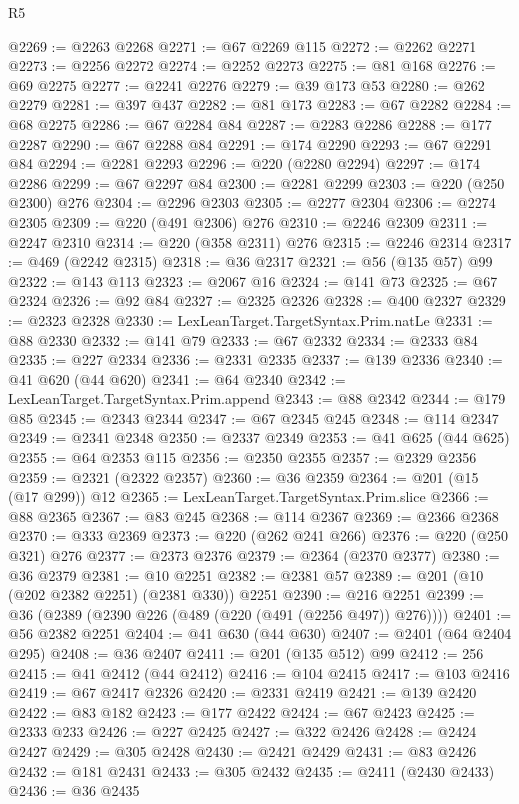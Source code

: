 \begin{lexlean}{R5}
\begin{coremodule}
@2269 := @2263 @2268
@2271 := @67 @2269 @115
@2272 := @2262 @2271
@2273 := @2256 @2272
@2274 := @2252 @2273
@2275 := @81 @168
@2276 := @69 @2275
@2277 := @2241 @2276
@2279 := @39 @173 @53
@2280 := @262 @2279
@2281 := @397 @437
@2282 := @81 @173
@2283 := @67 @2282
@2284 := @68 @2275
@2286 := @67 @2284 @84
@2287 := @2283 @2286
@2288 := @177 @2287
@2290 := @67 @2288 @84
@2291 := @174 @2290
@2293 := @67 @2291 @84
@2294 := @2281 @2293
@2296 := @220 (@2280 @2294)
@2297 := @174 @2286
@2299 := @67 @2297 @84
@2300 := @2281 @2299
@2303 := @220 (@250 @2300) @276
@2304 := @2296 @2303
@2305 := @2277 @2304
@2306 := @2274 @2305
@2309 := @220 (@491 @2306) @276
@2310 := @2246 @2309
@2311 := @2247 @2310
@2314 := @220 (@358 @2311) @276
@2315 := @2246 @2314
@2317 := @469 (@2242 @2315)
@2318 := @36 @2317
@2321 := @56 (@135 @57) @99
@2322 := @143 @113
@2323 := @2067 @16
@2324 := @141 @73
@2325 := @67 @2324
@2326 := @92 @84
@2327 := @2325 @2326
@2328 := @400 @2327
@2329 := @2323 @2328
@2330 := LexLeanTarget.TargetSyntax.Prim.natLe
@2331 := @88 @2330
@2332 := @141 @79
@2333 := @67 @2332
@2334 := @2333 @84
@2335 := @227 @2334
@2336 := @2331 @2335
@2337 := @139 @2336
@2340 := @41 @620 (@44 @620)
@2341 := @64 @2340
@2342 := LexLeanTarget.TargetSyntax.Prim.append
@2343 := @88 @2342
@2344 := @179 @85
@2345 := @2343 @2344
@2347 := @67 @2345 @245
@2348 := @114 @2347
@2349 := @2341 @2348
@2350 := @2337 @2349
@2353 := @41 @625 (@44 @625)
@2355 := @64 @2353 @115
@2356 := @2350 @2355
@2357 := @2329 @2356
@2359 := @2321 (@2322 @2357)
@2360 := @36 @2359
@2364 := @201 (@15 (@17 @299)) @12
@2365 := LexLeanTarget.TargetSyntax.Prim.slice
@2366 := @88 @2365
@2367 := @83 @245
@2368 := @114 @2367
@2369 := @2366 @2368
@2370 := @333 @2369
@2373 := @220 (@262 @241 @266)
@2376 := @220 (@250 @321) @276
@2377 := @2373 @2376
@2379 := @2364 (@2370 @2377)
@2380 := @36 @2379
@2381 := @10 @2251
@2382 := @2381 @57
@2389 := @201 (@10 (@202 @2382 @2251) (@2381 @330)) @2251
@2390 := @216 @2251
@2399 := @36 (@2389 (@2390 @226 (@489 (@220 (@491 (@2256 @497)) @276))))
@2401 := @56 @2382 @2251
@2404 := @41 @630 (@44 @630)
@2407 := @2401 (@64 @2404 @295)
@2408 := @36 @2407
@2411 := @201 (@135 @512) @99
@2412 := 256
@2415 := @41 @2412 (@44 @2412)
@2416 := @104 @2415
@2417 := @103 @2416
@2419 := @67 @2417 @2326
@2420 := @2331 @2419
@2421 := @139 @2420
@2422 := @83 @182
@2423 := @177 @2422
@2424 := @67 @2423
@2425 := @2333 @233
@2426 := @227 @2425
@2427 := @322 @2426
@2428 := @2424 @2427
@2429 := @305 @2428
@2430 := @2421 @2429
@2431 := @83 @2426
@2432 := @181 @2431
@2433 := @305 @2432
@2435 := @2411 (@2430 @2433)
@2436 := @36 @2435

\end{coremodule}
\end{lexlean}
